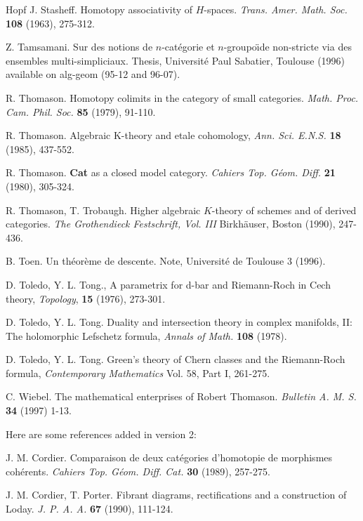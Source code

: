 \begin{thebibliography}{Hopf}
J. Stasheff. Homotopy associativity of $H$-spaces. {\em Trans. Amer. Math.
Soc.} {\bf 108} (1963), 275-312.

Z. Tamsamani.  Sur des notions de $n$-cat\'egorie et $n$-groupo\"{\i}de non-stricte
via des ensembles multi-simpliciaux. Thesis, Universit\'e Paul Sabatier,
Toulouse (1996) available on alg-geom (95-12 and 96-07).

R. Thomason. Homotopy colimits in the category of small categories. {\em Math.
Proc. Cam. Phil. Soc.} {\bf 85} (1979), 91-110.

R. Thomason.  Algebraic K-theory and etale cohomology, {\em Ann. Sci. E.N.S.}
{\bf 18} (1985), 437-552.

R. Thomason. {\bf Cat} as a closed model category. {\em Cahiers Top.
G\'eom. Diff.} {\bf 21}
(1980), 305-324.

R. Thomason, T. Trobaugh. Higher algebraic $K$-theory of schemes and of
derived categories.
{\em The Grothendieck Festschrift, Vol. III} Birkh\"auser, Boston (1990),
247-436.

B. Toen. Un th\'eor\`eme de descente. Note, Universit\'e de
Toulouse 3 (1996).

D. Toledo,  Y. L. Tong., A parametrix for {d-bar}  and Riemann-Roch in Cech
theory, {\em Topology}, {\bf 15} (1976),  273-301.

D. Toledo, Y. L. Tong. Duality and intersection theory in complex
manifolds, II:  The holomorphic Lefschetz formula, {\em Annals of Math.} {\bf
108} (1978).

D. Toledo, Y. L. Tong. Green's theory of Chern classes and the
Riemann-Roch formula, {\em  Contemporary Mathematics} Vol. 58, Part I, 261-275.

C. Wiebel. The mathematical enterprises of Robert Thomason. {\em
Bulletin A. M. S.} {\bf 34} (1997) 1-13.

Here are some references added in version 2:

J. M. Cordier. Comparaison de deux cat\'egories d'homotopie de morphismes
coh\'erents. {\em Cahiers Top. G\'eom. Diff. Cat.} {\bf 30} (1989),
257-275.

J. M. Cordier, T. Porter. Fibrant diagrams, rectifications and a construction
of Loday. {\em J. P. A. A.} {\bf 67} (1990), 111-124.


\end{thebibliography}
